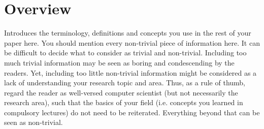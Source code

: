 \chapter{Overview}\label{ch:overview}
Introduces the terminology, definitions and concepts you use in the rest of your paper here.
You should mention every non-trivial piece of information here. 
It can be difficult to decide what to consider as trivial and non-trivial.
Including too much trivial information may be seen as boring and condescending by the readers.
Yet, including too little non-trivial information might be considered as a lack of understanding your research topic and area.
Thus, as a rule of thumb, regard the reader as well-versed computer scientist (but not necessarily the research area), such that the basics of your field (i.e. concepts you learned in compulsory lectures) do not need to be reiterated.
Everything beyond that can be seen as non-trivial.
